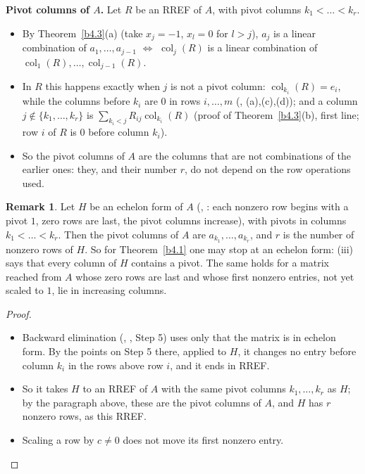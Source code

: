 \documentclass[12pt]{article}
\DeclareMathOperator{\col}{col}
\theoremstyle{definition}
\newtheorem{remark}[theorem]{Remark}
\begin{document}
\textbf{Pivot columns of \(A\).} Let \(R\) be an RREF of \(A\), with pivot columns \(k_1<\dots<k_r\).
\begin{itemize}
\item By Theorem~\ref{b4.3}(a) (take \(x_j=-1\), \(x_l=0\) for \(l>j\)), \(a_j\) is a linear combination of
\(a_1,\dots,a_{j-1}\) \(\iff\) \(\col_j(R)\) is a linear combination of \(\col_1(R),\dots,\col_{j-1}(R)\).
\item In \(R\) this happens exactly when \(j\) is not a pivot column: \(\col_{k_i}(R)=e_i\), while the columns before
\(k_i\) are \(0\) in rows \(i,\dots,m\) (, (a),(c),(d)); and a column
\(j\notin\{k_1,\dots,k_r\}\) is \(\sum_{k_i<j}R_{ij}\col_{k_i}(R)\) (proof of Theorem~\ref{b4.3}(b), first line; row \(i\)
of \(R\) is \(0\) before column \(k_i\)).
\item So the pivot columns of \(A\) are the columns that are not combinations of the earlier ones: they, and their
number \(r\), do not depend on the row operations used.
\end{itemize}

\begin{remark}\label{b4.2}
Let \(H\) be an echelon form of \(A\) (, : each nonzero row begins with a pivot \(1\), zero rows are
last, the pivot columns increase), with pivots in columns \(k_1<\dots<k_r\). Then the pivot columns of \(A\) are
\(a_{k_1},\dots,a_{k_r}\), and \(r\) is the number of nonzero rows of \(H\). So for Theorem~\ref{b4.1} one may stop at
an echelon form: (iii) says that every column of \(H\) contains a pivot. The same holds for a matrix reached from \(A\)
whose zero rows are last and whose first nonzero entries, not yet scaled to \(1\), lie in increasing columns.
\end{remark}
\begin{proof}
\begin{itemize}
\item Backward elimination (, , Step 5) uses only that the matrix is in echelon form. By the
points on Step 5 there, applied to \(H\), it changes no entry before column \(k_i\) in the rows above row \(i\), and it
ends in RREF.
\item So it takes \(H\) to an RREF of \(A\) with the same pivot columns \(k_1,\dots,k_r\) as \(H\); by the paragraph
above, these are the pivot columns of \(A\), and \(H\) has \(r\) nonzero rows, as this RREF.
\item Scaling a row by \(c\ne0\) does not move its first nonzero entry.\qedhere
\end{itemize}
\end{proof}
\end{document}
